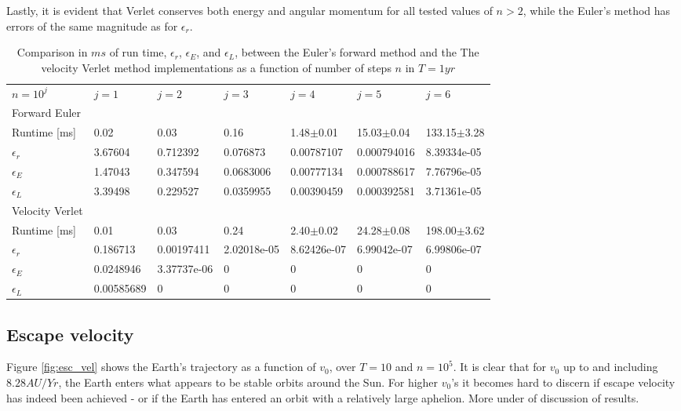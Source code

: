 \documentclass[%
oneside,                 %
final,                   %
10pt]{article}
\begin{document}
Lastly, it is evident that Verlet conserves both energy and angular momentum for all tested values of $n>2$, while the Euler's method has errors of the same magnitude as for $\epsilon_r$.

   
\begin{table}[h]
\begin{tabular}{lllllll}
$n=10^j$         & $j=1$      & $j=2$       & $j=3$       & $j=4$         & $j=5$          & $j=6$           \\
Forward Euler    &            &             &             &               &                &                 \\
Runtime {[}ms{]} & 0.02       & 0.03        & 0.16        & 1.48$\pm$0.01 & 15.03$\pm$0.04 & 133.15$\pm$3.28 \\
$\epsilon_r$     & 3.67604    & 0.712392    & 0.076873    & 0.00787107    & 0.000794016    & 8.39334e-05     \\
$\epsilon_E$     & 1.47043    & 0.347594    & 0.0683006   & 0.00777134    & 0.000788617    & 7.76796e-05     \\
$\epsilon_L$     & 3.39498    & 0.229527    & 0.0359955   & 0.00390459    & 0.000392581    & 3.71361e-05     \\
Velocity Verlet  &            &             &             &               &                &                 \\
Runtime {[}ms{]} & 0.01       & 0.03        & 0.24        & 2.40$\pm$0.02 & 24.28$\pm$0.08 & 198.00$\pm$3.62 \\
$\epsilon_r$     & 0.186713   & 0.00197411  & 2.02018e-05 & 8.62426e-07   & 6.99042e-07    & 6.99806e-07     \\
$\epsilon_E$     & 0.0248946  & 3.37737e-06 & 0           & 0             & 0              & 0               \\
$\epsilon_L$     & 0.00585689 & 0           & 0           & 0             & 0              & 0              
\end{tabular}
\caption{Comparison in $ms$ of run time, $\epsilon_r$, $\epsilon_E$, and $\epsilon_L$, between the Euler's forward method and the The velocity Verlet method implementations as a function of number of steps $n$ in $T=1 yr$}
\label{tab:EulerVsVerlet}
\end{table}
    
 
\subsection{Escape velocity}
Figure \ref{fig:esc_vel} shows the Earth's trajectory as a function of $v_0$, over $T=10$ and $n=10^5$. It is clear that for $v_0$ up to and including $8.28 AU/Yr$, the Earth enters what appears to be stable orbits around the Sun. For higher $v_0$'s it becomes hard to discern if escape velocity has indeed been achieved - or if the Earth has entered an orbit with a relatively large aphelion. More under of discussion of results. 
\end{document}
